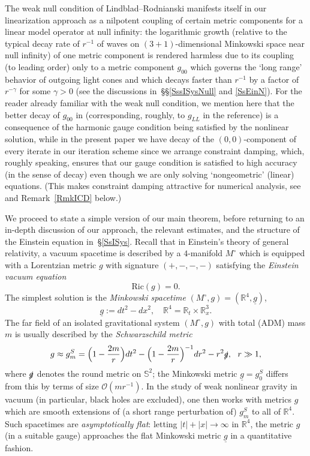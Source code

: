 \documentclass[reqno,11pt,letterpaper]{amsart}
\numberwithin{equation}{section}
\numberwithin{figure}{section}
\theoremstyle{definition}
\theoremstyle{remark}
\newcommand{\mc}{\mathcal}
\newcommand{\cO}{\mc O}
\newcommand{\R}{\mathbb{R}}
\newcommand{\Sph}{\mathbb{S}}
\newcommand{\slg}{\slashed{g}{}}
\newcommand{\ul}[1]{\underline{#1}{}}
\newcommand{\Ric}{\mathrm{Ric}}
\begin{document}
The weak null condition of Lindblad--Rodnianski \cite{LindbladRodnianskiWeakNull} manifests itself in our linearization approach as a nilpotent coupling of certain metric components for a linear model operator at null infinity: the logarithmic growth (relative to the typical decay rate of $r^{-1}$ of waves on $(3+1)$-dimensional Minkowski space near null infinity) of one metric component is rendered harmless due to its coupling (to leading order) only to a metric component $g_{0 0}$ which governs the `long range' behavior of outgoing light cones and which decays faster than $r^{-1}$ by a factor of $r^{-\gamma}$ for some $\gamma>0$ (see the discussions in~\S\S\ref{SssISysNull} and \ref{SsEinN}). For the reader already familiar with the weak null condition, we mention here that the better decay of $g_{0 0}$ in \cite{LindbladRodnianskiGlobalStability} (corresponding, roughly, to $g_{L L}$ in the reference) is a consequence of the harmonic gauge condition being satisfied by the nonlinear solution, while in the present paper we have decay of the $(0,0)$-component of every iterate in our iteration scheme since we arrange constraint damping, which, roughly speaking, ensures that our gauge condition is satisfied to high accuracy (in the sense of decay) even though we are only solving `nongeometric' (linear) equations. (This makes constraint damping attractive for numerical analysis, see \cite{GundlachCalabreseHinderMartinConstraintDamping,PretoriusBinaryBlackHole} and Remark~\ref{RmkICD} below.)

We proceed to state a simple version of our main theorem, before returning to an in-depth discussion of our approach, the relevant estimates, and the structure of the Einstein equation in~\S\ref{SsISys}. Recall that in Einstein's theory of general relativity, a vacuum spacetime is described by a $4$-manifold $M^\circ$ which is equipped with a Lorentzian metric $g$ with signature $(+,-,-,-)$ satisfying the \emph{Einstein vacuum equation}
\begin{equation}
\label{EqIEin}
  \Ric(g)=0.
\end{equation}
The simplest solution is the \emph{Minkowski spacetime} $(M^\circ,g)=(\R^4,\ul g)$,
\begin{equation}
\label{EqIMink}
  \ul g:=d t^2-d x^2,\quad \R^4=\R_t\times\R^3_x.
\end{equation}
The far field of an isolated gravitational system $(M^\circ,g)$ with total (ADM) mass $m$ is usually described by the \emph{Schwarzschild metric}
\begin{equation}
\label{EqISchw}
  g \approx g_m^S = \Bigl(1-\frac{2 m}{r}\Bigr)d t^2 - \Bigl(1-\frac{2 m}{r}\Bigr)^{-1}d r^2 - r^2\slg,\ \ r\gg 1,
\end{equation}
where $\slg$ denotes the round metric on $\Sph^2$; the Minkowski metric $\ul g=g_0^S$ differs from this by terms of size $\cO(m r^{-1})$. In the study of weak nonlinear gravity in vacuum (in particular, black holes are excluded), one then works with metrics $g$ which are smooth extensions of (a short range perturbation of) $g_m^S$ to all of $\R^4$. Such spacetimes are \emph{asymptotically flat}: letting $|t|+|x|\to\infty$ in $\R^4$, the metric $g$ (in a suitable gauge) approaches the flat Minkowski metric $\ul g$ in a quantitative fashion.
\end{document}
